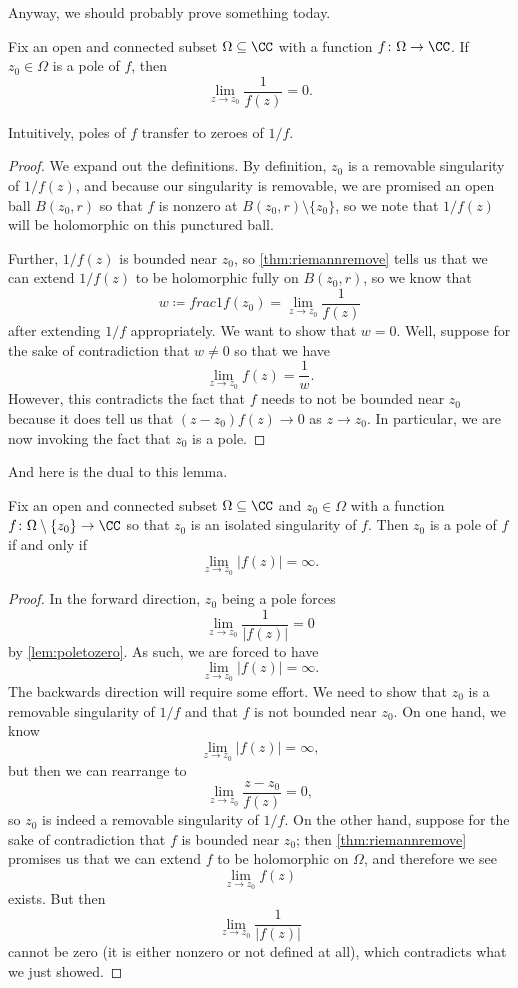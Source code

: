 \documentclass[../notes.tex]{subfiles}
\begin{document}
Anyway, we should probably prove something today.
\begin{lemma} \label{lem:poletozero}
	Fix an open and connected subset $\Omega\subseteq\CC$ with a function $f\colon \Omega\to\CC$. If $z_0\in\Omega$ is a pole of $f$, then
	\[\lim_{z\to z_0}\frac1{f(z)}=0.\]
\end{lemma}
Intuitively, poles of $f$ transfer to zeroes of $1/f$.
\begin{proof}
	We expand out the definitions. By definition, $z_0$ is a removable singularity of $1/f(z)$, and because our singularity is removable, we are promised an open ball $B(z_0,r)$ so that $f$ is nonzero at $B(z_0,r)\setminus\{z_0\}$, so we note that $1/f(z)$ will be holomorphic on this punctured ball.
	
	Further, $1/f(z)$ is bounded near $z_0$, so \autoref{thm:riemannremove} tells us that we can extend $1/f(z)$ to be holomorphic fully on $B(z_0,r)$, so we know that
	\[w\coloneqq frac1{f(z_0)}=\lim_{z\to z_0}\frac1{f(z)}\]
	after extending $1/f$ appropriately. We want to show that $w=0$. Well, suppose for the sake of contradiction that $w\ne0$ so that we have
	\[\lim_{z\to z_0}f(z)=\frac1w.\]
	However, this contradicts the fact that $f$ needs to not be bounded near $z_0$ because it does tell us that $(z-z_0)f(z)\to0$ as $z\to z_0$. In particular, we are now invoking the fact that $z_0$ is a pole.
\end{proof}
And here is the dual to this lemma.
\begin{lemma}
	Fix an open and connected subset $\Omega\subseteq\CC$ and $z_0\in\Omega$ with a function $f\colon \Omega\setminus\{z_0\}\to\CC$ so that $z_0$ is an isolated singularity of $f$. Then $z_0$ is a pole of $f$ if and only if
	\[\lim_{z\to z_0}|f(z)|=\infty.\]
\end{lemma}
\begin{proof}
	In the forward direction, $z_0$ being a pole forces
	\[\lim_{z\to z_0}\frac1{|f(z)|}=0\]
	by \autoref{lem:poletozero}. As such, we are forced to have
	\[\lim_{z\to z_0}|f(z)|=\infty.\]
	The backwards direction will require some effort. We need to show that $z_0$ is a removable singularity of $1/f$ and that $f$ is not bounded near $z_0$. On one hand, we know
	\[\lim_{z\to z_0}|f(z)|=\infty,\]
	but then we can rearrange to
	\[\lim_{z\to z_0}\frac{z-z_0}{f(z)}=0,\]
	so $z_0$ is indeed a removable singularity of $1/f$. On the other hand, suppose for the sake of contradiction that $f$ is bounded near $z_0$; then \autoref{thm:riemannremove} promises us that we can extend $f$ to be holomorphic on $\Omega$, and therefore we see
	\[\lim_{z\to z_0}f(z)\]
	exists. But then
	\[\lim_{z\to z_0}\frac1{|f(z)|}\]
	cannot be zero (it is either nonzero or not defined at all), which contradicts what we just showed.
\end{proof}
\end{document}
